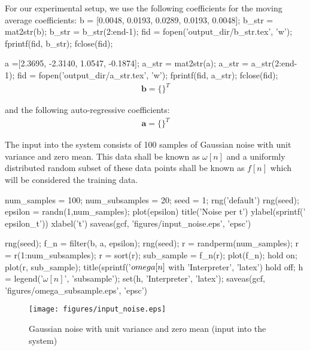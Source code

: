 \documentclass[11pt, twoside]{article}   	%
\newenvironment{matlab}{\comment}{\endcomment}
\begin{document}
For our experimental setup, we use the following coefficients for the moving average coefficients: 
\begin{matlab}
b = [0.0048, 0.0193, 0.0289, 0.0193, 0.0048];
b_str = mat2str(b);
b_str = b_str(2:end-1);
fid = fopen('output_dir/b_str.tex', 'w'); 
fprintf(fid, b_str); 
fclose(fid); 


a =[2.3695, -2.3140, 1.0547, -0.1874];
a_str = mat2str(a);
a_str = a_str(2:end-1);
fid = fopen('output_dir/a_str.tex', 'w'); 
fprintf(fid, a_str); 
fclose(fid); 
\end{matlab}
\begin{align}
\mathbf{b} = \{\}^T
\end{align}

and the following auto-regressive coefficients: 
\begin{align}
\mathbf{a} = \{\}^T
\end{align}

The input into the system consists of 100 samples of Gaussian 
noise with unit variance and zero mean. This data shall be known 
as $\omega[n]$ and a uniformly distributed random subset of these 
data points shall be known as $f[n]$ which will be considered the training 
data.

\begin{matlab}
num_samples = 100;
num_subsamples = 20;
seed = 1; 
rng('default')
rng(seed); 
epsilon = randn(1,num_samples);
plot(epsilon) 
title('Noise per t')
ylabel(sprintf('\\epsilon_t'))
xlabel('t')
saveas(gcf, 'figures/input_noise.eps', 'epsc')

rng(seed); 
f_n = filter(b, a, epsilon);
rng(seed); 
r = randperm(num_samples); %
r = r(1:num_subsamples); %
r = sort(r); %
sub_sample = f_n(r); 
plot(f_n); hold on; 
plot(r, sub_sample); 
title(sprintf('$\\omega[n]$ with %
   'Interpreter', 'latex')
hold off; 
h = legend('$\omega[n]$', 'subsample');
set(h, 'Interpreter', 'latex');
saveas(gcf, 'figures/omega_subsample.eps', 'epsc')

\end{matlab}
\begin{figure}[h]
\centering
\texttt{[image: figures/input\_noise.eps]}
\caption{Gaussian noise with unit variance and zero mean (input into the system)}
\label{fig:input_noise} 
\end{figure}
\FloatBarrier
\end{document}
